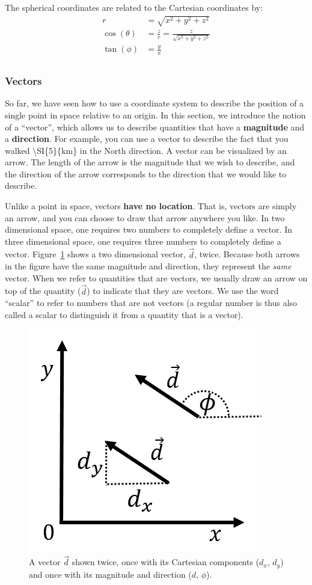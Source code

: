 The spherical coordinates are related to the Cartesian coordinates by:
\begin{align*}
r &= \sqrt{x^2+y^2+z^2}\\
\cos(\theta) &= \frac{z}{r}=\frac{z}{\sqrt{x^2+y^2+z^2}}\\
\tan(\phi) &= \frac{y}{x}\\
\end{align*}

\subsubsection{Vectors}

So far, we have seen how to use a coordinate system to describe the position of a single point in space relative to an origin. In this section, we introduce the notion of a ``vector'', which allows us to describe quantities that have a \textbf{magnitude} and a \textbf{direction}. For example, you can use a vector to describe the fact that you walked {\textbackslash}SI\{5\}\{km\} in the North direction. A vector can be visualized by an arrow. The length of the arrow is the magnitude that we wish to describe, and the direction of the arrow corresponds to the direction that we would like to describe.

Unlike a point in space, vectors \textbf{have no location}. That is, vectors are simply an arrow, and you can choose to draw that arrow anywhere you like. In two dimensional space, one requires two numbers to completely define a vector. In three dimensional space, one requires three numbers to completely define a vector. Figure~\ref{fig:Vectors:dvec} shows a two dimensional vector, $\vec d$, twice. Because both arrows in the figure have the same magnitude and direction, they represent the \textit{same} vector. When we refer to quantities that are vectors, we usually draw an arrow on top of the quantity ($\vec d$) to indicate that they are vectors. We use the word ``scalar'' to refer to numbers that are not vectors (a regular number is thus also called a scalar to distinguish it from a quantity that is a vector).

\begin{figure}[!htbp]
\centering
\includegraphics[width=0.375\linewidth]{files/dvec-3a378ef1835699572191f35e5e90f3f5.png}
\caption[]{A vector $\vec d$ shown twice, once with its Cartesian components ($d_x$, $d_y$) and once with its magnitude and direction ($d$, $\phi$).}
\label{fig:Vectors:dvec}
\end{figure}

